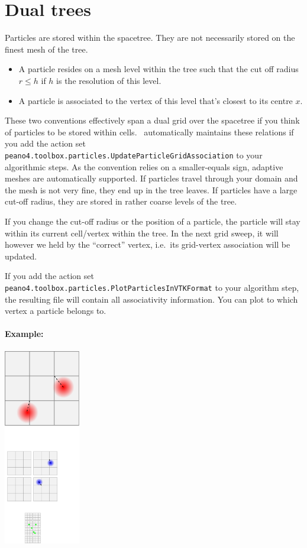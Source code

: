 \section{Dual trees}

Particles are stored within the spacetree.
They are not necessarily stored on the finest mesh of the tree.

\begin{itemize}
  \item A particle resides on a mesh level within the tree such that the
  cut off radius $r \leq h$ if $h$ is the resolution of this level.
  \item A particle is associated to the vertex of this level that's closest to
  its centre $x$.
\end{itemize}

\noindent
These two conventions effectively span a dual grid over the spacetree if you
think of particles to be stored within cells.
\Peano\ automatically maintains these relations if you add the action set 
\texttt{peano4.toolbox.particles.UpdateParticleGridAssociation} to your
algorithmic steps.
As the convention relies on a smaller-equals sign, adaptive meshes are
automatically supported.
If particles travel through your domain and the mesh is not very fine, they
end up in the tree leaves.
If particles have a large cut-off radius, they are stored in rather coarse
levels of the tree.


If you change the cut-off radius or the position of a particle, the particle
will stay within its current cell/vertex within the tree.
In the next grid sweep, it will however we held by the ``correct'' vertex,
i.e.~its grid-vertex association will be updated.


If you add the action set
\texttt{peano4.toolbox.particles.PlotParticlesInVTKFormat} to your algorithm
step, the resulting file will contain all associativity information.
You can plot to which vertex a particle belongs to.


\paragraph{Example:}

\begin{center}
 \includegraphics[width=0.25\textwidth]{61_pidt/dual-tree.pdf}
\end{center}

